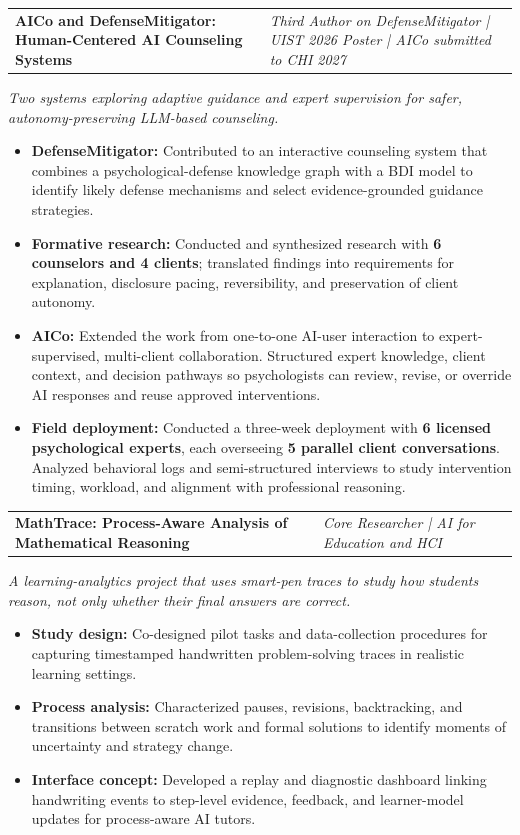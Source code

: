 \documentclass[10pt,a4paper]{article}
\makeatletter
\newcommand{\project}[2]{%
  \vspace{0.32em}%
  \begin{tabularx}{\textwidth}{@{}X>{\raggedleft\arraybackslash}p{5.35cm}@{}}
    {\color{navy}\fontsize{10.35}{11.6}\selectfont\bfseries #1} &
    {\color{muted}\fontsize{8.65}{10.1}\selectfont\itshape #2}
  \end{tabularx}%
  \vspace{-0.16em}%
}
\newcommand{\summaryline}[1]{%
  {\color{muted}\fontsize{8.9}{10.6}\selectfont\itshape #1}\par\vspace{0.05em}%
}
\newcommand{\metric}[1]{{\color{teal}\bfseries #1}}
\makeatother
\begin{document}
\project{AICo and DefenseMitigator: Human-Centered AI Counseling Systems}{Third Author on DefenseMitigator | UIST 2026 Poster | AICo submitted to CHI 2027}
\summaryline{Two systems exploring adaptive guidance and expert supervision for safer, autonomy-preserving LLM-based counseling.}
\begin{itemize}
  \item \textbf{DefenseMitigator:} Contributed to an interactive counseling system that combines a psychological-defense knowledge graph with a BDI model to identify likely defense mechanisms and select evidence-grounded guidance strategies.
  \item \textbf{Formative research:} Conducted and synthesized research with \metric{6 counselors and 4 clients}; translated findings into requirements for explanation, disclosure pacing, reversibility, and preservation of client autonomy.
  \item \textbf{AICo:} Extended the work from one-to-one AI-user interaction to expert-supervised, multi-client collaboration. Structured expert knowledge, client context, and decision pathways so psychologists can review, revise, or override AI responses and reuse approved interventions.
  \item \textbf{Field deployment:} Conducted a three-week deployment with \metric{6 licensed psychological experts}, each overseeing \metric{5 parallel client conversations}. Analyzed behavioral logs and semi-structured interviews to study intervention timing, workload, and alignment with professional reasoning.
\end{itemize}

\project{MathTrace: Process-Aware Analysis of Mathematical Reasoning}{Core Researcher | AI for Education and HCI}
\summaryline{A learning-analytics project that uses smart-pen traces to study how students reason, not only whether their final answers are correct.}
\begin{itemize}
  \item \textbf{Study design:} Co-designed pilot tasks and data-collection procedures for capturing timestamped handwritten problem-solving traces in realistic learning settings.
  \item \textbf{Process analysis:} Characterized pauses, revisions, backtracking, and transitions between scratch work and formal solutions to identify moments of uncertainty and strategy change.
  \item \textbf{Interface concept:} Developed a replay and diagnostic dashboard linking handwriting events to step-level evidence, feedback, and learner-model updates for process-aware AI tutors.
\end{itemize}
\end{document}
